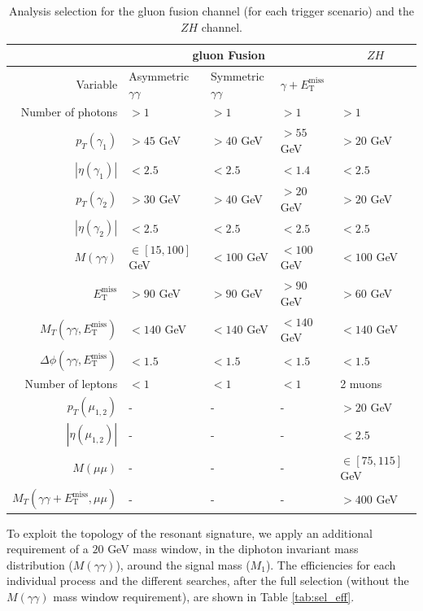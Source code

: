 \documentclass[11pt]{article}
\newcommand{\MET}{\ensuremath{E_{\mathrm{T}}^{\mathrm{miss}}}\xspace}
\begin{document}
\begin{table}[]
\centering
\begin{tabular}{| r | l | l | l| l|}
\hline
 & \multicolumn{3}{|c|}{gluon Fusion} & \multicolumn{1}{|c|}{$ZH$} \\ 
\hline
Variable & Asymmetric $\gamma\gamma$ & Symmetric $\gamma\gamma$ &$ \gamma+\MET$ & \\ \hline
Number of photons       & $> 1$         & $> 1$         & $> 1$         & $> 1$\\
$p_{T}(\gamma_{1})$     & $ > 45$ GeV   & $ > 40$ GeV   & $ > 55$ GeV   & $ > 20$ GeV\\
$|\eta(\gamma_{1})|$    & $ < 2.5$      & $ < 2.5$      & $ < 1.4$      & $< 2.5$ \\
$p_{T}(\gamma_{2})$     & $ > 30$ GeV   & $ > 40$ GeV   & $ > 20$ GeV   & $ > 20$ GeV\\
$|\eta(\gamma_{2})|$    & $ < 2.5$      & $ < 2.5$      & $ < 2.5$      & $ < 2.5$ \\
$M(\gamma\gamma)$       & $\in [15, 100]$ GeV & $< 100$ GeV & $< 100$ GeV & $< 100$ GeV \\
$\MET$                  & $> 90$ GeV    & $> 90$ GeV    & $> 90$ GeV    & $> 60$ GeV \\
$M_{T}(\gamma\gamma,\MET)$                    & $< 140$ GeV   & $< 140$ GeV   & $< 140$ GeV   & $< 140$ GeV \\
$\Delta\phi(\gamma\gamma,\MET)$ & $< 1.5$ & $< 1.5$ & $< 1.5$ & $< 1.5$ \\
Number of leptons       & $< 1$         & $< 1$         & $< 1$         & 2 muons \\
\hline
$p_{T}(\mu_{1,2})$ & -  & - & - & $ > 20$ GeV \\
$|\eta(\mu_{1,2})|$ & - & - & - & $ < 2.5$ \\
$M(\mu\mu)$ & - & - & - & $\in [75,115]$ GeV\\
$M_{T}(\gamma\gamma+\MET, \mu\mu)$ & - & - & - & $> 400$ GeV\\
\hline
\end{tabular}
\caption{Analysis selection for the gluon fusion channel (for each trigger scenario) and the $ZH$ channel.}
\label{tab:sel_all}
\end{table}

To exploit the topology of the resonant signature, we apply an additional requirement of a $20$ GeV mass window, in the diphoton invariant mass distribution ($M(\gamma\gamma)$), around the signal mass ($M_1$). The efficiencies for each individual process and the different searches, after the full selection (without the $M(\gamma\gamma)$ mass window requirement), are shown in Table \ref{tab:sel_eff}.
\end{document}
